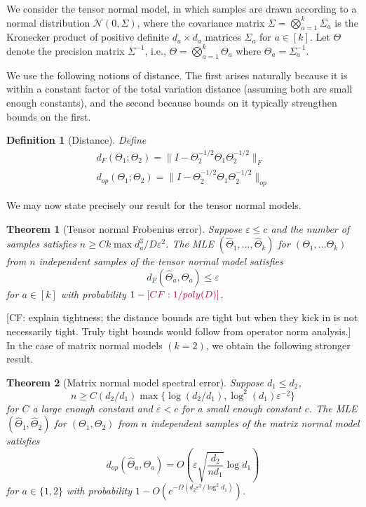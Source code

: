 \documentclass{article}
\newtheorem{theorem}{Theorem}
\newtheorem{definition}{Definition}
\newcommand\eps{\varepsilon}
\newcommand\cN{\mathcal{N}}
\newcommand{\CF}[1]{{\color{purple}[CF: #1]}}
\begin{document}
We consider the tensor normal model, in which samples are drawn according to a normal distribution $\cN(0, \Sigma)$, where the covariance matrix $\Sigma = \bigotimes_{a = 1}^{k} \Sigma_a$ is the Kronecker product of positive definite $d_a\times d_a$ matrices $\Sigma_a$ for $a\in [k]$.
Let $\Theta$ denote the precision matrix $\Sigma^{-1}$, i.e., $\Theta = \bigotimes_{a=1}^k \Theta_a$ where $\Theta_a = \Sigma_a^{-1}$.

We use the following notions of distance. The first arises naturally because it is within a constant factor of the total variation distance (assuming both are small enough constants), and the second because bounds on it typically strengthen bounds on the first.

\begin{definition}[Distance]
Define
\begin{align}d_{F}(\Theta_1; \Theta_2) = \| I - \Theta_2^{-1/2} \Theta_1 \Theta_2^{-1/2}\|_F\\
d_{op}(\Theta_1; \Theta_2) = \| I - \Theta_2^{-1/2} \Theta_1 \Theta_2^{-1/2}\|_{op}
\end{align}
\end{definition}

We may now state precisely our result for the tensor normal models.

\begin{theorem}[Tensor normal Frobenius error]\label{thm:tensor-frobenius} Suppose $\eps \leq c$ and the number of samples satisfies $n \geq C k \max d_{a}^3/D\eps^2$. The MLE $(\widehat{\Theta}_1, \dots, \widehat{\Theta}_k) $ for $(\Theta_1, \dots \Theta_k)$ from $n$ independent samples of the tensor normal model satisfies
$$ d_{F}(\widehat{\Theta}_a, \Theta_a) \leq \eps $$
for $a \in [k]$ with probability $1 - \CF{1/poly(D)}$.
\end{theorem}

\CF{explain tightness; the distance bounds are tight but when they kick in is not necessarily tight. Truly tight bounds would follow from operator norm analysis.} In the case of matrix normal models $(k=2)$, we obtain the following stronger result.

\begin{theorem}[Matrix normal model spectral error]\label{thm:matrix-normal} Suppose $d_1 \leq d_2$,
$$n \geq C (d_2/d_1) \max\{\log (d_2/d_1),  \log^2(d_1) \eps^{-2}\}$$ for $C$ a large enough constant and $\eps < c$ for a small enough constant $c$. The MLE $(\widehat{\Theta}_1,\widehat{\Theta}_2) $ for $(\Theta_1, \Theta_2)$ from $n$ independent samples of the matrix normal model satisfies
$$ d_{op}(\widehat{\Theta}_a, \Theta_a) = O\left(\eps \sqrt{\frac{d_2}{n d_1}} \log d_1\right) $$
for $a \in \{1,2\}$ with probability $1 - O(e^{ - \Omega( d_2 \eps^2/\log^2 d_1)})$.
\end{theorem}
\end{document}
